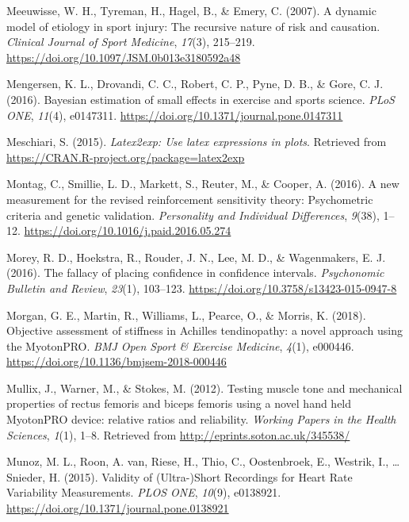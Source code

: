\documentclass[
  english,
  man,floatsintext]{apa6}
\begin{document}
\leavevmode\hypertarget{ref-Meeuwisse2007}{}%
Meeuwisse, W. H., Tyreman, H., Hagel, B., \& Emery, C. (2007). A dynamic model of etiology in sport injury: The recursive nature of risk and causation. \emph{Clinical Journal of Sport Medicine}, \emph{17}(3), 215--219. \url{https://doi.org/10.1097/JSM.0b013e3180592a48}

\leavevmode\hypertarget{ref-Mengersen2016}{}%
Mengersen, K. L., Drovandi, C. C., Robert, C. P., Pyne, D. B., \& Gore, C. J. (2016). Bayesian estimation of small effects in exercise and sports science. \emph{PLoS ONE}, \emph{11}(4), e0147311. \url{https://doi.org/10.1371/journal.pone.0147311}

\leavevmode\hypertarget{ref-R-latex2exp}{}%
Meschiari, S. (2015). \emph{Latex2exp: Use latex expressions in plots}. Retrieved from \url{https://CRAN.R-project.org/package=latex2exp}

\leavevmode\hypertarget{ref-Reuter2015}{}%
Montag, C., Smillie, L. D., Markett, S., Reuter, M., \& Cooper, A. (2016). A new measurement for the revised reinforcement sensitivity theory: Psychometric criteria and genetic validation. \emph{Personality and Individual Differences}, \emph{9}(38), 1--12. \url{https://doi.org/10.1016/j.paid.2016.05.274}

\leavevmode\hypertarget{ref-Morey2016}{}%
Morey, R. D., Hoekstra, R., Rouder, J. N., Lee, M. D., \& Wagenmakers, E. J. (2016). The fallacy of placing confidence in confidence intervals. \emph{Psychonomic Bulletin and Review}, \emph{23}(1), 103--123. \url{https://doi.org/10.3758/s13423-015-0947-8}

\leavevmode\hypertarget{ref-Morgan2018}{}%
Morgan, G. E., Martin, R., Williams, L., Pearce, O., \& Morris, K. (2018). Objective assessment of stiffness in Achilles tendinopathy: a novel approach using the MyotonPRO. \emph{BMJ Open Sport \& Exercise Medicine}, \emph{4}(1), e000446. \url{https://doi.org/10.1136/bmjsem-2018-000446}

\leavevmode\hypertarget{ref-Mullix2012}{}%
Mullix, J., Warner, M., \& Stokes, M. (2012). Testing muscle tone and mechanical properties of rectus femoris and biceps femoris using a novel hand held MyotonPRO device: relative ratios and reliability. \emph{Working Papers in the Health Sciences}, \emph{1}(1), 1--8. Retrieved from \url{http://eprints.soton.ac.uk/345538/}

\leavevmode\hypertarget{ref-Munoz2015}{}%
Munoz, M. L., Roon, A. van, Riese, H., Thio, C., Oostenbroek, E., Westrik, I., \ldots{} Snieder, H. (2015). Validity of (Ultra-)Short Recordings for Heart Rate Variability Measurements. \emph{PLOS ONE}, \emph{10}(9), e0138921. \url{https://doi.org/10.1371/journal.pone.0138921}
\end{document}

